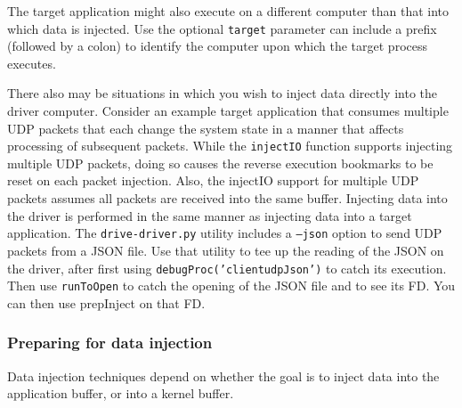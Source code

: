 \documentclass[titlepage]{article}
\begin{document}
The target application might also execute on a different computer than that into which data is injected.  Use the optional {\tt target} parameter
can include a prefix (followed by a colon) to identify the computer upon which the target process executes.

There also may be situations in which you wish to inject data directly into the driver computer.  Consider an example target application that consumes
multiple UDP packets that each change the system state in a manner that affects processing of subsequent packets.  While the {\tt injectIO} function
supports injecting multiple UDP packets, doing so causes the reverse execution bookmarks to be reset on each packet injection.  Also, the injectIO
support for multiple UDP packets assumes all packets are received into the same buffer.  Injecting data into the driver is performed in the same
manner as injecting data into a target application.  The {\tt drive-driver.py} utility includes a {\tt --json} option to send UDP packets from a
JSON file.  Use that utility to tee up the reading of the JSON on the driver, after first using {\tt debugProc('clientudpJson')} to catch its execution.
Then use {\tt runToOpen} to catch the opening of the JSON file and to see its FD.  You can then use prepInject on that FD.

\subsubsection{Preparing for data injection}
\label{prepInject}
Data injection techniques depend on whether the goal is to inject data into the application buffer, or into a kernel buffer.
\end{document}
